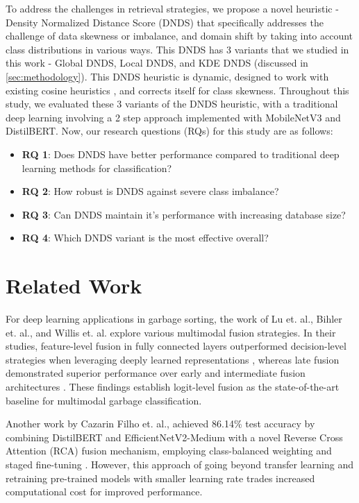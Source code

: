 \documentclass{article}
\begin{document}
To address the challenges in retrieval strategies, we propose a novel heuristic - Density Normalized Distance Score (DNDS) that specifically addresses the challenge of data skewness or imbalance, and domain shift by taking into account class distributions in various ways. This DNDS has 3 variants that we studied in this work - Global DNDS, Local DNDS, and KDE DNDS (discussed in \autoref{sec:methodology}). This DNDS heuristic is dynamic, designed to work with existing cosine heuristics \cite{xie2023brief}, and corrects itself for class skewness. Throughout this study, we evaluated these 3 variants of the DNDS heuristic, with a traditional deep learning involving a 2 step approach implemented with MobileNetV3 and DistilBERT. Now, our research questions (RQs) for this study are as follows:  

\begin{itemize}
  \item \textbf{RQ 1}: Does DNDS have better performance compared to traditional deep learning methods for classification? 
  \item \textbf{RQ 2}: How robust is DNDS against severe class imbalance?
  \item \textbf{RQ 3}: Can DNDS maintain it's performance with increasing database size?
  \item \textbf{RQ 4}: Which DNDS variant is the most effective overall?
\end{itemize}

\section{Related Work}
\label{sec:related work}

For deep learning applications in garbage sorting, the work of Lu et. al., Bihler et. al., and Willis et. al. explore various multimodal fusion strategies. In their studies, feature-level fusion in fully connected layers outperformed decision-level strategies when leveraging deeply learned representations \cite{lu2022deep}, whereas late fusion demonstrated superior performance over early and intermediate fusion architectures \cite{bihler2023multi, willis2025exploring}. These findings establish logit-level fusion as the state-of-the-art baseline for multimodal garbage classification.

Another work by Cazarin Filho et. al., achieved 86.14\% test accuracy by combining DistilBERT and EfficientNetV2-Medium with a novel Reverse Cross Attention (RCA) fusion mechanism, employing class-balanced weighting and staged fine-tuning \cite{cazarin2025garbage}. However, this approach of going beyond transfer learning and retraining pre-trained models with smaller learning rate trades increased computational cost for improved performance.
\end{document}
